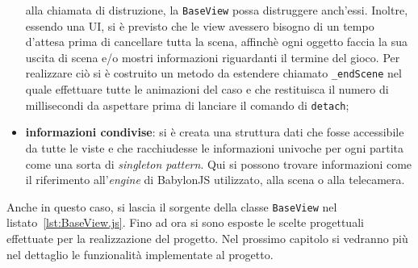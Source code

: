 \begin{itemize}
    alla chiamata di distruzione, la \texttt{BaseView} possa distruggere anch'essi. Inoltre, essendo una UI, si è previsto che le view avessero bisogno di un tempo d'attesa prima di 
    cancellare tutta la scena, affinchè ogni oggetto faccia la sua uscita di scena e/o mostri informazioni riguardanti il termine del gioco. Per realizzare ciò si è costruito un metodo 
    da estendere chiamato \texttt{\_endScene} nel quale effettuare tutte le animazioni del caso e che restituisca il numero di millisecondi da aspettare prima di lanciare il comando di 
    \texttt{detach};
    \item \textbf{informazioni condivise}: si è creata una struttura dati che fosse accessibile da tutte le viste e che racchiudesse le informazioni univoche per ogni partita come una sorta
    di \textit{singleton pattern}. Qui si possono trovare informazioni come il riferimento all'\textit{engine} di BabylonJS utilizzato, alla scena o alla telecamera.
\end{itemize}
Anche in questo caso, si lascia il sorgente della classe \texttt{BaseView} nel listato~\ref{lst:BaseView.js}.
Fino ad ora si sono esposte le scelte progettuali effettuate per la realizzazione del progetto. Nel prossimo capitolo si vedranno più nel dettaglio le funzionalità implementate
al progetto.